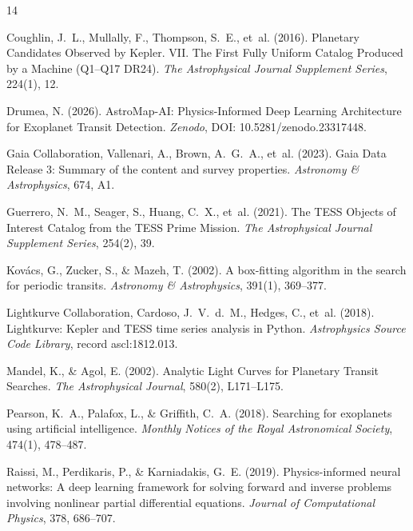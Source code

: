 \documentclass[11pt,a4paper]{article}
\begin{document}
\begin{thebibliography}{14}
\providecommand{\natexlab}[1]{#1}
\providecommand{\url}[1]{\texttt{#1}}

Coughlin, J.~L., Mullally, F., Thompson, S.~E., et~al. (2016).
Planetary Candidates Observed by Kepler. VII. The First Fully Uniform Catalog Produced by a Machine (Q1--Q17 DR24).
\textit{The Astrophysical Journal Supplement Series}, 224(1), 12.

Drumea, N. (2026).
AstroMap-AI: Physics-Informed Deep Learning Architecture for Exoplanet Transit Detection.
\textit{Zenodo}, DOI: 10.5281/zenodo.23317448.

Gaia Collaboration, Vallenari, A., Brown, A.~G.~A., et~al. (2023).
Gaia Data Release 3: Summary of the content and survey properties.
\textit{Astronomy \& Astrophysics}, 674, A1.

Guerrero, N.~M., Seager, S., Huang, C.~X., et~al. (2021).
The TESS Objects of Interest Catalog from the TESS Prime Mission.
\textit{The Astrophysical Journal Supplement Series}, 254(2), 39.

Kov{\'a}cs, G., Zucker, S., \& Mazeh, T. (2002).
A box-fitting algorithm in the search for periodic transits.
\textit{Astronomy \& Astrophysics}, 391(1), 369--377.

Lightkurve Collaboration, Cardoso, J.~V.~d.~M., Hedges, C., et~al. (2018).
Lightkurve: Kepler and TESS time series analysis in Python.
\textit{Astrophysics Source Code Library}, record ascl:1812.013.

Mandel, K., \& Agol, E. (2002).
Analytic Light Curves for Planetary Transit Searches.
\textit{The Astrophysical Journal}, 580(2), L171--L175.

Pearson, K.~A., Palafox, L., \& Griffith, C.~A. (2018).
Searching for exoplanets using artificial intelligence.
\textit{Monthly Notices of the Royal Astronomical Society}, 474(1), 478--487.

Raissi, M., Perdikaris, P., \& Karniadakis, G.~E. (2019).
Physics-informed neural networks: A deep learning framework for solving forward and inverse problems involving nonlinear partial differential equations.
\textit{Journal of Computational Physics}, 378, 686--707.


\end{thebibliography}
\end{document}
